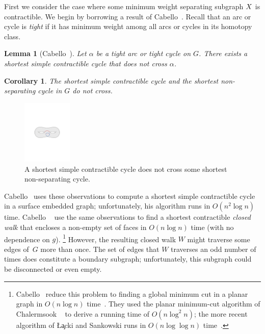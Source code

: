 \documentclass[11pt,twoside]{article}
\newtheorem{corollary}[theorem]{Corollary}
\newtheorem{lemma}[theorem]{Lemma}
\begin{document}
{First we consider the case where some minimum weight separating subgraph $X$ is contractible.  
We begin by borrowing a result of Cabello~\cite[Lemma 4.1]{c-fscss-10}.  Recall that an arc or cycle is \emph{tight} if it has minimum weight among all arcs or cycles in its homotopy class.

\begin{lemma}[Cabello~\cite{c-fscss-10}]
\label{lem:disjoint-tight-arc}
Let $\alpha$ be a tight arc or tight cycle on $G$.  There exists a shortest simple contractible cycle that does not cross $\alpha$.
\end{lemma}

\begin{corollary}
\label{cor:disjoint-sep-cycle}
The shortest simple contractible cycle and the shortest non-separating cycle in $G$ do not cross.
\end{corollary}

\begin{figure}[ht]
\centering
\includegraphics[height=1.2in]{Fig/shortcon-vs-shortnonsep}
\caption{A shortest simple contractible cycle does not cross some shortest non-separating cycle.}
\label{fig:global_shortcon-vs-shortnonsep}
\end{figure}

Cabello~\cite{c-fscss-10} uses these observations to compute a shortest simple contractible cycle in a surface embedded graph; unfortunately, his algorithm runs in $O(n^2\log n)$ time.
Cabello \etal~\cite{cdem-fotc-10} use the same observations to find a shortest contractible \emph{closed walk} that encloses a non-empty set of faces in $O(n\log n)$ time (with no dependence on $g$).%
%
\footnote{Cabello \etal\ reduce this problem to finding a global minimum cut in a planar graph in $O(n \log n)$ time~\cite{cdem-fotc-10}.  They used the planar minimum-cut algorithm of Chalermsook \etal~\cite{cfn-dnlta-04} to derive a running time of $O(n\log^2 n)$; the more recent algorithm of \L\c{a}cki and Sankowski runs in $O(n \log \log n)$  time~\cite{ls-mcsc-11}.}
%
However, the resulting closed walk $W$ might traverse some edges of~$G$ more than once.  The set of edges that $W$ traverses an odd number of times does constitute a boundary subgraph; unfortunately, this subgraph could be disconnected or even empty.

}
\end{document}
